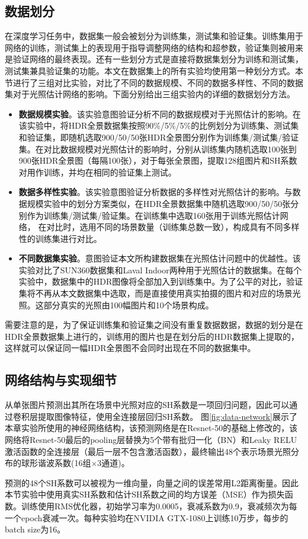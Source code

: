 \subsection{数据划分}
在深度学习任务中，数据集一般会被划分为训练集，测试集和验证集。训练集用于网络的训练，测试集上的表现用于指导调整网络的结构和超参数，验证集则被用来是验证网络的最终表现。还有一些划分方式是直接将数据集划分为训练和测试集，测试集兼具验证集的功能。本文在数据集上的所有实验均使用第一种划分方式。本节进行了三组对比实验，对比了不同的数据规模、不同的数据多样性、不同的数据集对于光照估计网络的影响。下面分别给出三组实验内的详细的数据划分方法。
\begin{itemize}
    \item \textbf{数据规模实验}。该实验意图验证分析不同的数据规模对于光照估计的影响。在该实验中，将HDR全景数据集按照90\%/5\%/5\%的比例划分为训练集、测试集和验证集，即随机选取900/50/50张HDR全景图分别作为训练集/测试集/验证集。在对比数据规模对光照估计的影响时，分别从训练集内随机选取100张到900张HDR全景图（每隔100张），对于每张全景图，提取128组图片和SH系数对用作训练，并均在相同的验证集上测试。
    \item \textbf{数据多样性实验}。该实验意图验证分析数据的多样性对光照估计的影响。与数据规模实验中的划分方案类似，在HDR全景数据集中随机选取900/50/50张分别作为训练集/测试集/验证集。在训练集中选取160张用于训练光照估计网络， 在对比时，选用不同的场景数量（训练集总数一致），构成具有不同多样性的训练集进行对比。
    \item \textbf{不同数据集实验}。意图验证本文所构建数据集在光照估计问题中的优越性。该实验对比了SUN360\cite{xiao2012recognizing}数据集和Laval Indoor\cite{gardner2017learning}两种用于光照估计的数据集。在每个实验中，数据集中的HDR图像将全部加入到训练集中。为了公平的对比，验证集将不再从本文数据集中选取，而是直接使用真实拍摄的图片和对应的场景光照。这部分真实的光照由100幅图片和10个场景构成。
\end{itemize}

需要注意的是，为了保证训练集和验证集之间没有重复数据数据，数据的划分是在HDR全景数据集上进行的，训练用的图片也是在划分后的HDR数据集上提取的，这样就可以保证同一幅HDR全景图不会同时出现在不同的数据集中。
\subsection{网络结构与实现细节}
从单张图片预测出其所在场景中光照对应的SH系数是一项回归问题，因此可以通过卷积层提取图像特征，使用全连接层回归SH系数。
图\ref{fig:data-network}展示了本章实验所使用的神经网络结构，该预测网络是在Resnet-50\cite{he2016deep}的基础上修改的，该网络将Resnet-50最后的pooling层替换为5个带有批归一化（BN）\cite{ioffe2015batch}和Leaky RELU激活函数\cite{maas2013rectifier}的全连接层（最后一层不包含激活函数），最终输出48个表示场景光照分布的球形谐波系数(16组$\times$3通道)。

预测的48个SH系数可以被视为一维向量，向量之间的误差常用L2距离衡量。因此本节实验中使用真实SH系数和估计SH系数之间的均方误差（MSE）作为损失函数。训练使用RMS优化器\cite{tieleman2012lecture}，初始学习率为0.0005，衰减系数为0.9，衰减频次为每一个epoch衰减一次。每种实验均在NVIDIA GTX-1080上训练10万步，每步的batch size为16。

